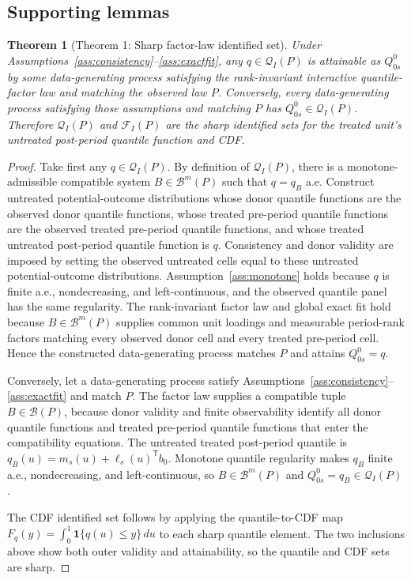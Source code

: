 \documentclass[11pt]{article}
\newcommand{\one}{\mathbf{1}}
\newcommand{\transpose}{\mathsf{T}}
\theoremstyle{definition}
\theoremstyle{plain}
\newtheorem{theorem}{Theorem}
\theoremstyle{remark}
\begin{document}
\subsection*{Supporting lemmas}
\begin{theorem}[Theorem 1: Sharp factor-law identified set]\label{thm:sharp-set}
Under Assumptions~\ref{ass:consistency}--\ref{ass:exactfit}, any \(q\in\mathcal{Q}_I(P)\) is attainable as \(Q^0_{0s}\) by some data-generating process satisfying the rank-invariant interactive quantile-factor law and matching the observed law \(P\).  Conversely, every data-generating process satisfying those assumptions and matching \(P\) has \(Q^0_{0s}\in\mathcal{Q}_I(P)\).  Therefore \(\mathcal{Q}_I(P)\) and \(\mathcal{F}_I(P)\) are the sharp identified sets for the treated unit's untreated post-period quantile function and CDF.
\end{theorem}
\begin{proof}
Take first any \(q\in\mathcal{Q}_I(P)\).  By definition of \(\mathcal{Q}_I(P)\), there is a monotone-admissible compatible system \(B\in\mathcal{B}^m(P)\) such that \(q=q_B\) a.e.  Construct untreated potential-outcome distributions whose donor quantile functions are the observed donor quantile functions, whose treated pre-period quantile functions are the observed treated pre-period quantile functions, and whose treated untreated post-period quantile function is \(q\).  Consistency and donor validity are imposed by setting the observed untreated cells equal to these untreated potential-outcome distributions.  Assumption~\ref{ass:monotone} holds because \(q\) is finite a.e., nondecreasing, and left-continuous, and the observed quantile panel has the same regularity.  The rank-invariant factor law and global exact fit hold because \(B\in\mathcal{B}^m(P)\) supplies common unit loadings and measurable period-rank factors matching every observed donor cell and every treated pre-period cell.  Hence the constructed data-generating process matches \(P\) and attains \(Q^0_{0s}=q\).

Conversely, let a data-generating process satisfy Assumptions~\ref{ass:consistency}--\ref{ass:exactfit} and match \(P\).  The factor law supplies a compatible tuple \(B\in\mathcal{B}(P)\), because donor validity and finite observability identify all donor quantile functions and treated pre-period quantile functions that enter the compatibility equations.  The untreated treated post-period quantile is \(q_B(u)=m_s(u)+\ell_s(u)^\transpose b_0\).  Monotone quantile regularity makes \(q_B\) finite a.e., nondecreasing, and left-continuous, so \(B\in\mathcal{B}^m(P)\) and \(Q^0_{0s}=q_B\in\mathcal{Q}_I(P)\).

The CDF identified set follows by applying the quantile-to-CDF map \(F_q(y)=\int_0^1\one\{q(u)\le y\}\,du\) to each sharp quantile element.  The two inclusions above show both outer validity and attainability, so the quantile and CDF sets are sharp.
\end{proof}
\end{document}
